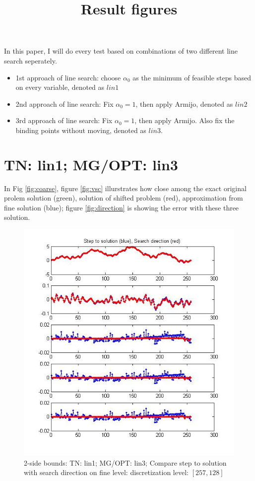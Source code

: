 \documentclass[10pt]{article}
\title{Result figures}
\begin{document}
\maketitle


In this paper, I will do every test based on combinations of two different line search seperately.
\begin{itemize}
\item 1st approach of line search: choose $\alpha_{0}$ as the minimum of feasible steps based on every variable, denoted as $lin1$
\item 2nd approach of line search: Fix $\alpha_{0}=1$, then apply Armijo, denoted as $lin2$
\item 3rd approach of line search:  Fix $\alpha_{0}=1$, then apply Armijo. Also fix the binding points without moving, denoted as $lin3$.
\end{itemize}

\section{TN: lin1; MG/OPT: lin3}

In Fig \ref{fig:coarse}, figure \ref{fig:vsc} illurstrates how close among the exact original prolem solution (green), solution of shifted problem  (red), approximation from fine solution (blue); 
figure \ref{fig:direction} is showing the error with these three solution. 

\begin{figure}
  \centering
  \includegraphics[width=1\textwidth]{finedirvs13}
  \caption{2-side bounds: TN: lin1; MG/OPT: lin3; Compare step to solution with search direction on fine level: discretization level: $[257,128]$}
  \label{fig:fine13}
\end{figure}
\end{document}
